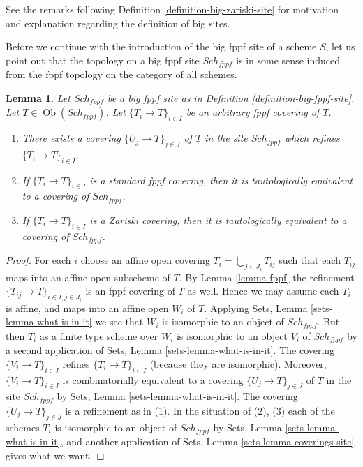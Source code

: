 \documentclass{stacks-project}
\theoremstyle{plain}
\newtheorem{lemma}[subsection]{Lemma}
\theoremstyle{definition}
\theoremstyle{remark}
\numberwithin{equation}{subsection}
\def\Sch{\mathit{Sch}}
\def\Ob{\mathop{\mathrm{Ob}}\nolimits}
\begin{document}
\noindent
See the remarks following Definition \ref{definition-big-zariski-site}
for motivation and explanation regarding the definition of big sites.

\medskip\noindent
Before we continue with the introduction of the big fppf site of
a scheme $S$, let us point out that the topology on a big fppf site
$\Sch_{fppf}$ is in some sense induced from the fppf topology
on the category of all schemes.

\begin{lemma}
\label{lemma-fppf-induced}
Let $\Sch_{fppf}$ be a big fppf site as in
Definition \ref{definition-big-fppf-site}.
Let $T \in \Ob(\Sch_{fppf})$.
Let $\{T_i \to T\}_{i \in I}$ be an arbitrary fppf covering of $T$.
\begin{enumerate}
\item There exists a covering $\{U_j \to T\}_{j \in J}$ of $T$ in the site
$\Sch_{fppf}$ which refines $\{T_i \to T\}_{i \in I}$.
\item If $\{T_i \to T\}_{i \in I}$ is a standard fppf covering, then
it is tautologically equivalent to a covering of $\Sch_{fppf}$.
\item If $\{T_i \to T\}_{i \in I}$ is a Zariski covering, then
it is tautologically equivalent to a covering of $\Sch_{fppf}$.
\end{enumerate}
\end{lemma}

\begin{proof}
For each $i$ choose an affine open covering $T_i = \bigcup_{j \in J_i} T_{ij}$
such that each $T_{ij}$ maps into an affine open subscheme of $T$. By
Lemma \ref{lemma-fppf}
the refinement $\{T_{ij} \to T\}_{i \in I, j \in J_i}$ is an fppf covering
of $T$ as well. Hence we may assume each $T_i$ is affine, and maps into
an affine open $W_i$ of $T$. Applying
Sets, Lemma \ref{sets-lemma-what-is-in-it}
we see that $W_i$ is isomorphic to an object of $\Sch_{fppf}$.
But then $T_i$ as a finite type scheme over $W_i$
is isomorphic to an object $V_i$ of $\Sch_{fppf}$ by a second
application of
Sets, Lemma \ref{sets-lemma-what-is-in-it}.
The covering $\{V_i \to T\}_{i \in I}$ refines $\{T_i \to T\}_{i \in I}$
(because they are isomorphic).
Moreover, $\{V_i \to T\}_{i \in I}$ is combinatorially equivalent to a
covering $\{U_j \to T\}_{j \in J}$ of $T$ in the site
$\Sch_{fppf}$ by
Sets, Lemma \ref{sets-lemma-what-is-in-it}.
The covering $\{U_j \to T\}_{j \in J}$ is a refinement as in (1).
In the situation of (2), (3) each of the
schemes $T_i$ is isomorphic to an object of $\Sch_{fppf}$ by
Sets, Lemma \ref{sets-lemma-what-is-in-it},
and another application of
Sets, Lemma \ref{sets-lemma-coverings-site}
gives what we want.
\end{proof}
\end{document}
